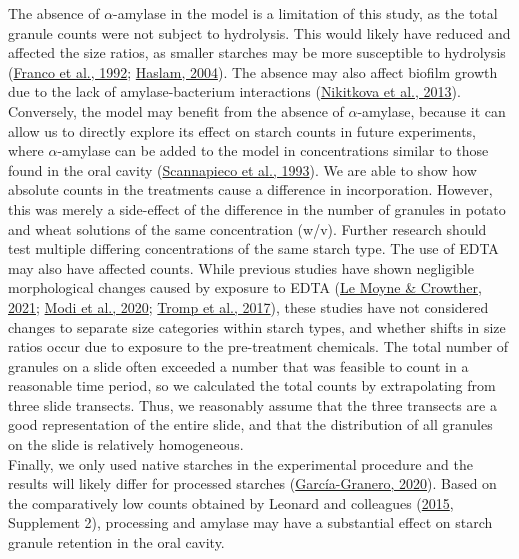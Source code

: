 \documentclass[
  letterpaper,
]{book}
\begin{document}
The absence of \(\alpha\)-amylase in the model is a limitation of this
study, as the total granule counts were not subject to hydrolysis. This
would likely have reduced and affected the size ratios, as smaller
starches may be more susceptible to hydrolysis
(\protect\hyperlink{ref-francoStarchDegradation1992}{Franco et al.,
1992}; \protect\hyperlink{ref-haslamDecompositionStarch2004}{Haslam,
2004}). The absence may also affect biofilm growth due to the lack of
amylase-bacterium interactions
(\protect\hyperlink{ref-nikitkovaStarchBiofilms2013}{Nikitkova et al.,
2013}). Conversely, the model may benefit from the absence of
\(\alpha\)-amylase, because it can allow us to directly explore its
effect on starch counts in future experiments, where \(\alpha\)-amylase
can be added to the model in concentrations similar to those found in
the oral cavity
(\protect\hyperlink{ref-scannapiecoSalivaryAmylase1993}{Scannapieco et
al., 1993}). We are able to show how absolute counts in the treatments
cause a difference in incorporation. However, this was merely a
side-effect of the difference in the number of granules in potato and
wheat solutions of the same concentration (w/v). Further research should
test multiple differing concentrations of the same starch type. The use
of EDTA may also have affected counts. While previous studies have shown
negligible morphological changes caused by exposure to EDTA
(\protect\hyperlink{ref-lemoyneCalculusPretreatments2021}{Le Moyne \&
Crowther, 2021};
\protect\hyperlink{ref-modiCalculusMethodologies2020}{Modi et al.,
2020}; \protect\hyperlink{ref-trompEDTACalculus2017}{Tromp et al.,
2017}), these studies have not considered changes to separate size
categories within starch types, and whether shifts in size ratios occur
due to exposure to the pre-treatment chemicals. The total number of
granules on a slide often exceeded a number that was feasible to count
in a reasonable time period, so we calculated the total counts by
extrapolating from three slide transects. Thus, we reasonably assume
that the three transects are a good representation of the entire slide,
and that the distribution of all granules on the slide is relatively
homogeneous.\\
Finally, we only used native starches in the experimental procedure and
the results will likely differ for processed starches
(\protect\hyperlink{ref-graneroStarchTaphonomy2020}{García-Granero,
2020}). Based on the comparatively low counts obtained by Leonard and
colleagues (\protect\hyperlink{ref-leonardPlantMicroremains2015}{2015},
Supplement 2), processing and amylase may have a substantial effect on
starch granule retention in the oral cavity.
\end{document}
